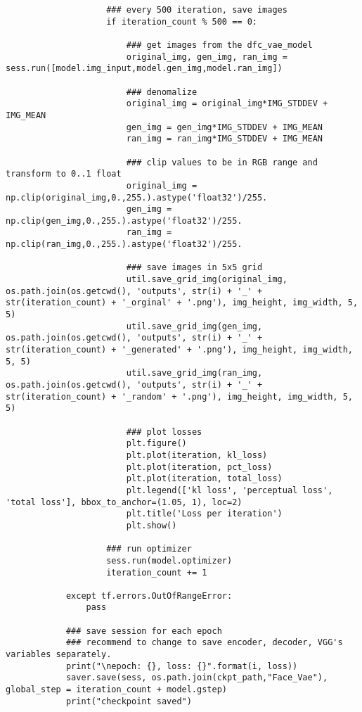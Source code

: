 \begin{footnotesize}
\begin{lstlisting}
                    ### every 500 iteration, save images
                    if iteration_count % 500 == 0:
                        
                        ### get images from the dfc_vae_model
                        original_img, gen_img, ran_img = sess.run([model.img_input,model.gen_img,model.ran_img])
                        
                        ### denomalize
                        original_img = original_img*IMG_STDDEV + IMG_MEAN
                        gen_img = gen_img*IMG_STDDEV + IMG_MEAN
                        ran_img = ran_img*IMG_STDDEV + IMG_MEAN
                        
                        ### clip values to be in RGB range and transform to 0..1 float
                        original_img = np.clip(original_img,0.,255.).astype('float32')/255.
                        gen_img = np.clip(gen_img,0.,255.).astype('float32')/255.
                        ran_img = np.clip(ran_img,0.,255.).astype('float32')/255.
                        
                        ### save images in 5x5 grid
                        util.save_grid_img(original_img, os.path.join(os.getcwd(), 'outputs', str(i) + '_' + str(iteration_count) + '_orginal' + '.png'), img_height, img_width, 5, 5)
                        util.save_grid_img(gen_img, os.path.join(os.getcwd(), 'outputs', str(i) + '_' + str(iteration_count) + '_generated' + '.png'), img_height, img_width, 5, 5)
                        util.save_grid_img(ran_img, os.path.join(os.getcwd(), 'outputs', str(i) + '_' + str(iteration_count) + '_random' + '.png'), img_height, img_width, 5, 5)
                        
                        ### plot losses
                        plt.figure()
                        plt.plot(iteration, kl_loss)
                        plt.plot(iteration, pct_loss)
                        plt.plot(iteration, total_loss)
                        plt.legend(['kl loss', 'perceptual loss', 'total loss'], bbox_to_anchor=(1.05, 1), loc=2)
                        plt.title('Loss per iteration')
                        plt.show()
                    
                    ### run optimizer
                    sess.run(model.optimizer)
                    iteration_count += 1

            except tf.errors.OutOfRangeError:
                pass
            
            ### save session for each epoch
            ### recommend to change to save encoder, decoder, VGG's variables separately.
            print("\nepoch: {}, loss: {}".format(i, loss))
            saver.save(sess, os.path.join(ckpt_path,"Face_Vae"), global_step = iteration_count + model.gstep)
            print("checkpoint saved")
            


\end{lstlisting}
\end{footnotesize}
